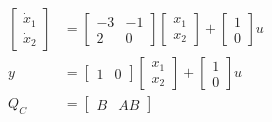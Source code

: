 \documentclass[11pt,a4paper]{article}
\begin{document}
\begin{tcolorbox}[solbox, title=Detailed Solution -- Question 178]
\[
\begin{aligned} \left[\begin{array}{c}\dot{x}_{1} \\\dot{x}_{2}\end{array}\right]&=\left[\begin{array}{cc}-3 & -1 \\2 & 0\end{array}\right]\left[\begin{array}{l}x_{1} \\x_{2}\end{array}\right]+\left[\begin{array}{l}1 \\0\end{array}\right] u \\ y&=\left[\begin{array}{ll}1 & 0\end{array}\right]\left[\begin{array}{l}x_{1} \\x_{2}\end{array}\right]+\left[\begin{array}{l}1 \\0\end{array}\right] u \\ Q_{C}&=\left[\begin{array}{ll}B & A B\end{array}\right]\\ \end{aligned}
\]


\end{tcolorbox}
\end{document}

